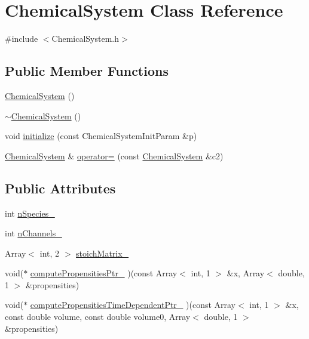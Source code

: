 \hypertarget{class_chemical_system}{\section{\-Chemical\-System \-Class \-Reference}
\label{class_chemical_system}
}


{\ttfamily \#include $<$\-Chemical\-System.\-h$>$}

\subsection*{\-Public \-Member \-Functions}
\begin{DoxyCompactItemize}
\item 
\hyperlink{class_chemical_system_a7106e98e261b3c4a51c6b0fd21d6301e}{\-Chemical\-System} ()
\item 
\hyperlink{class_chemical_system_ab056d2da25c858768b3a51cbca17a0b4}{$\sim$\-Chemical\-System} ()
\item 
void \hyperlink{class_chemical_system_a067774d7960a8ade62ee90b9df952cdb}{initialize} (const \-Chemical\-System\-Init\-Param \&p)
\item 
\hyperlink{class_chemical_system}{\-Chemical\-System} \& \hyperlink{class_chemical_system_a4da5a7a81afbf8ead8ece35089f6abc8}{operator=} (const \hyperlink{class_chemical_system}{\-Chemical\-System} \&c2)
\end{DoxyCompactItemize}
\subsection*{\-Public \-Attributes}
\begin{DoxyCompactItemize}
\item 
int \hyperlink{class_chemical_system_afcd6d3452b7a6badf31d85a54eab1168}{n\-Species\-\_\-}
\item 
int \hyperlink{class_chemical_system_a3fc8beba6ac2e8ae92b5dfa30b1742c1}{n\-Channels\-\_\-}
\item 
\-Array$<$ int, 2 $>$ \hyperlink{class_chemical_system_adf3ff92439692f9b4fff0200bce7b1ef}{stoich\-Matrix\-\_\-}
\item 
void($\ast$ \hyperlink{class_chemical_system_ad9e0ad31cedef0acd02f28b24905cb62}{compute\-Propensities\-Ptr\-\_\-} )(const \-Array$<$ int, 1 $>$ \&x, \-Array$<$ double, 1 $>$ \&propensities)
\item 
void($\ast$ \hyperlink{class_chemical_system_a3d13c124984ab85b686c6d15f3a1c610}{compute\-Propensities\-Time\-Dependent\-Ptr\-\_\-} )(const \-Array$<$ int, 1 $>$ \&x, const double volume, const double volume0, \-Array$<$ double, 1 $>$ \&propensities)
\end{DoxyCompactItemize}


